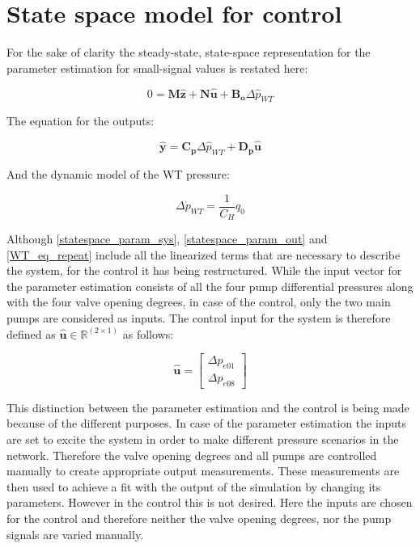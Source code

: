 \section{State space model for control}
 \label{SystemLin_control}
 
For the sake of clarity the steady-state, state-space representation for the parameter estimation for small-signal values is restated here:
 
 \begin{equation}
 0 = \pmb{M} \pmb{\hat{z}} + \pmb{N} \pmb{\hat{u}} + \pmb{B_o} \Delta \hat{p}_{WT}    
 \label{statespace_param_sys}
\end{equation}

The equation for the outputs:

\begin{equation}
  \pmb{\hat{y}} = \pmb{C_p} \Delta \hat{p}_{WT} + \pmb{D_p} \pmb{\hat{u}} 
   \label{statespace_param_out}
\end{equation}

And the dynamic model of the WT pressure:

\begin{equation}
\Delta \dot{p}_{WT} = \frac{1}{C_H} q_0
 \label{WT_eq_repeat}
\end{equation}

Although \eqref{statespace_param_sys}, \eqref{statespace_param_out} and \eqref{WT_eq_repeat} include all the linearized terms that are necessary to describe the system, for the control it has being restructured. While the input vector for the parameter estimation consists of all the four pump differential pressures along with the four valve opening degrees, in case of the control, only the two main pumps are considered as inputs. The control input for the system is therefore defined as $\pmb{\hat{u}} \in \pmb{\mathbb{R}}^{(2 \times 1)}$ as follows: 

\begin{equation}
\pmb{\hat{u}} =
\begin{bmatrix} 
\Delta p_{e01} \\
\Delta p_{e08} 
\label{inputvector_control}
\end{bmatrix} 
\end{equation}

This distinction between the parameter estimation and the control is being made because of the different purposes. In case of the parameter estimation the inputs are set to excite the system in order to make different pressure scenarios in the network. Therefore the valve opening degrees and all pumps are controlled manually to create appropriate output measurements. These measurements are then used to achieve a fit with the output of the simulation by changing its parameters. However in the control this is not desired. Here the inputs are chosen for the control and therefore neither the valve opening degrees, nor the pump signals are varied manually. 

